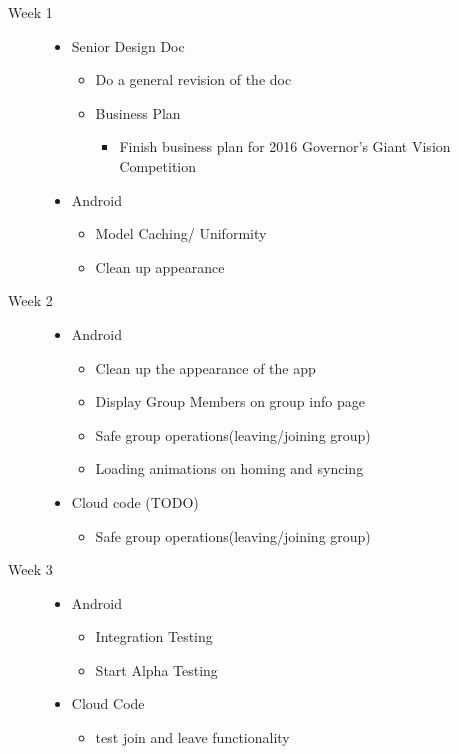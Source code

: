 \documentclass[11pt]{article}
\begin{document}
\begin{description}
	\item[Week 1] \hfill
		\begin{itemize}
		\item Senior Design Doc
		\begin{itemize}
			\item Do a general revision of the doc
		\end{itemize}
		\begin{itemize}
		\item Business Plan
			\begin{itemize}
			\item Finish business plan for 2016 Governor's Giant Vision Competition
			\end{itemize}
		\end{itemize}
		\item Android
		\begin{itemize}
			\item Model Caching/ Uniformity
			\item Clean up appearance
		\end{itemize}
	\end{itemize}
	
  \item[Week 2] \hfill
		\begin{itemize}
		\item Android
		\begin{itemize}
			\item Clean up the appearance of the app
			\item Display Group Members on group info page
			\item Safe group operations(leaving/joining group)
			\item Loading animations on homing and syncing
		\end{itemize}
		\item Cloud code (TODO)
		\begin{itemize}
			\item Safe group operations(leaving/joining group)
		\end{itemize}
	\end{itemize}
  
  \item[Week 3] \hfill
		\begin{itemize}
		\item Android
		\begin{itemize}
			\item Integration Testing
			\item Start Alpha Testing
		\end{itemize}
		\item Cloud Code
		\begin{itemize}
			\item test join and leave functionality
		\end{itemize}
	\end{itemize}
\end{description}
\end{document}
